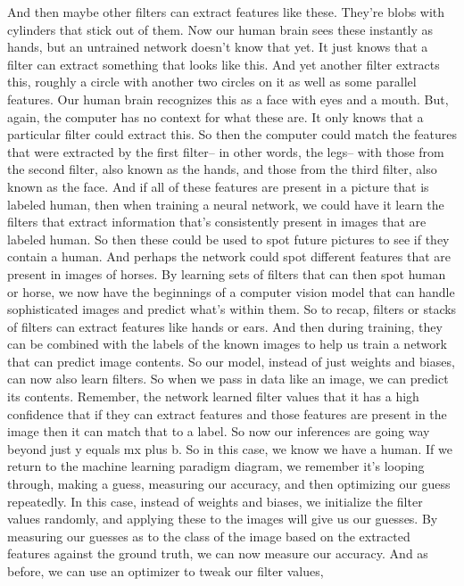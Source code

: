 And then maybe other filters can extract features like these.
They're blobs with cylinders that stick out of them.
Now our human brain sees these instantly as hands,
but an untrained network doesn't know that yet.
It just knows that a filter can extract something that looks like this.
And yet another filter extracts this, roughly a circle
with another two circles on it as well as some parallel features.
Our human brain recognizes this as a face with eyes and a mouth.
But, again, the computer has no context for what these are.
It only knows that a particular filter could extract this.
So then the computer could match the features that
were extracted by the first filter--
in other words, the legs--
with those from the second filter, also known
as the hands, and those from the third filter, also known as the face.
And if all of these features are present in a picture that is labeled human,
then when training a neural network, we could
have it learn the filters that extract information
that's consistently present in images that are labeled human.
So then these could be used to spot future pictures
to see if they contain a human.
And perhaps the network could spot different features
that are present in images of horses.
By learning sets of filters that can then spot human or horse,
we now have the beginnings of a computer vision model
that can handle sophisticated images and predict what's within them.
So to recap, filters or stacks of filters
can extract features like hands or ears.
And then during training, they can be combined
with the labels of the known images to help us train a network that
can predict image contents.
So our model, instead of just weights and biases, can now also learn filters.
So when we pass in data like an image, we can predict its contents.
Remember, the network learned filter values
that it has a high confidence that if they can extract features
and those features are present in the image then
it can match that to a label.
So now our inferences are going way beyond just y equals mx plus b.
So in this case, we know we have a human.
If we return to the machine learning paradigm diagram,
we remember it's looping through, making a guess, measuring our accuracy,
and then optimizing our guess repeatedly.
In this case, instead of weights and biases,
we initialize the filter values randomly,
and applying these to the images will give us our guesses.
By measuring our guesses as to the class of the image
based on the extracted features against the ground truth,
we can now measure our accuracy.
And as before, we can use an optimizer to tweak our filter values,
